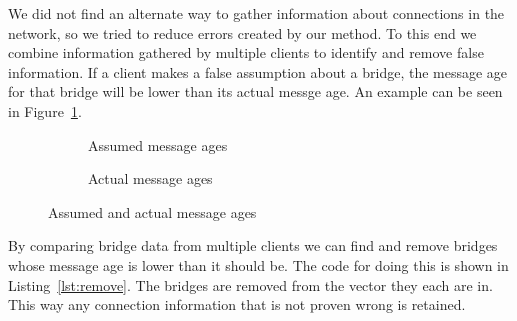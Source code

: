 We did not find an alternate way to gather information about connections in the network, so we tried to reduce errors created by our method.
To this end we combine information gathered by multiple clients to identify and remove false information.
If a client makes a false assumption about a bridge, the message age for that bridge will be lower than its actual messge age.
An example can be seen in Figure~\ref{fig:message_ages}.
\begin{figure}[h]
    \begin{subfigure}[b]{0.4\textwidth}
        \caption{Assumed message ages}
    \end{subfigure}
    \hspace{1cm}
    \begin{subfigure}[b]{0.4\textwidth}
        \caption{Actual message ages}
    \end{subfigure}

    \caption{Assumed and actual message ages}
    \label{fig:message_ages}
\end{figure}
By comparing bridge data from multiple clients we can find and remove bridges whose message age is lower than it should be.
The code for doing this is shown in Listing~\ref{lst:remove}.
The bridges are removed from the vector they each are in.
This way any connection information that is not proven wrong is retained.

